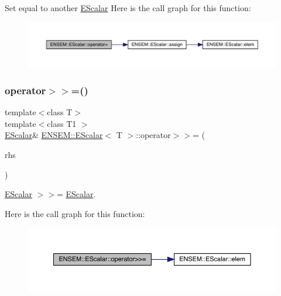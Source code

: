 Set equal to another \mbox{\hyperlink{classENSEM_1_1EScalar}{E\+Scalar}} Here is the call graph for this function\+:
\nopagebreak
\begin{figure}[H]
\begin{center}
\leavevmode
\includegraphics[width=350pt]{d0/d82/classENSEM_1_1EScalar_a8ec804b8b082a748bb364fbb4a511757_cgraph}
\end{center}
\end{figure}
\mbox{\label{classENSEM_1_1EScalar_a0e520529327800038c3775d195819b6f}} 
\subsubsection{\texorpdfstring{operator$>$$>$=()}{operator>>=()}\hspace{0.1cm}{\footnotesize\ttfamily [1/2]}}
{\footnotesize\ttfamily template$<$class T$>$ \\
template$<$class T1 $>$ \\
\mbox{\hyperlink{classENSEM_1_1EScalar}{E\+Scalar}}\& \mbox{\hyperlink{classENSEM_1_1EScalar}{E\+N\+S\+E\+M\+::\+E\+Scalar}}$<$ T $>$\+::operator$>$$>$= (\begin{DoxyParamCaption}\item[{const \mbox{\hyperlink{classENSEM_1_1EScalar}{E\+Scalar}}$<$ T1 $>$ \&}]{rhs }\end{DoxyParamCaption})\hspace{0.3cm}{\ttfamily [inline]}}



\mbox{\hyperlink{classENSEM_1_1EScalar}{E\+Scalar}} $>$$>$= \mbox{\hyperlink{classENSEM_1_1EScalar}{E\+Scalar}}. 

Here is the call graph for this function\+:
\nopagebreak
\begin{figure}[H]
\begin{center}
\leavevmode
\includegraphics[width=350pt]{d0/d82/classENSEM_1_1EScalar_a0e520529327800038c3775d195819b6f_cgraph}
\end{center}
\end{figure}
\mbox{\label{classENSEM_1_1EScalar_a0e520529327800038c3775d195819b6f}} 
